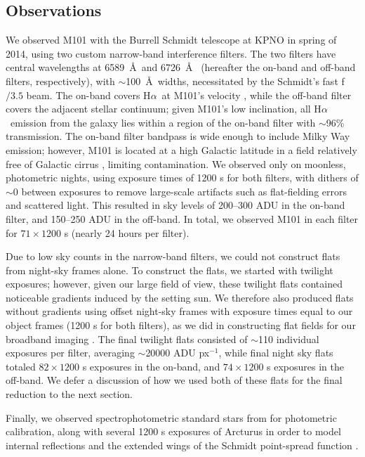 \documentclass[iop]{emulateapj}
\newcommand{\ha}{H$\alpha$}
\begin{document}
\subsection{Observations}

We observed M101 with the Burrell Schmidt telescope at KPNO in spring
of 2014, using two custom narrow-band interference filters. The two
filters have central wavelengths at 6589~\AA \ and 6726~\AA
\ (hereafter the on-band and off-band filters, respectively), with
$\sim$100~\AA \ widths, necessitated by the Schmidt's fast f$/3.5$
beam.  The on-band covers \ha \ at M101's velocity \citep[$\sim$240 km
  s$^{-1}$;][]{devau91}, while the off-band filter covers the adjacent
stellar continuum; given M101's low inclination, all \ha \ emission
from the galaxy lies within a region of the on-band filter with
$\sim$96\% transmission.  The on-band filter bandpass is wide enough
to include Milky Way emission; however, M101 is located at a high
Galactic latitude in a field relatively free of Galactic cirrus
\citep{schlegel98, schlafly11}, limiting contamination.  We observed
only on moonless, photometric nights, using exposure times of 1200 s
for both filters, with dithers of $\sim$0 between exposures
to remove large-scale artifacts such as flat-fielding errors and
scattered light.  This resulted in sky levels of 200--300 ADU in the
on-band filter, and 150--250 ADU in the off-band.  In total, we
observed M101 in each filter for $71 \times 1200$ s (nearly 24 hours
per filter).

Due to low sky counts in the narrow-band filters, we could not
construct flats from night-sky frames alone.  To construct the flats,
we started with twilight exposures; however, given our large field of
view, these twilight flats contained noticeable gradients induced by
the setting sun.  We therefore also produced flats without gradients
using offset night-sky frames with exposure times equal to our object
frames (1200 s for both filters), as we did in constructing flat
fields for our broadband imaging \citep[see][]{watkins14, mihos17}.
The final twilight flats consisted of $\sim$110 individual exposures
per filter, averaging $\sim$20000 ADU px$^{-1}$, while final night sky
flats totaled $82 \times 1200$ s exposures in the on-band, and $74
\times 1200$ s exposures in the off-band.  We defer a discussion of
how we used both of these flats for the final reduction to the next
section.

Finally, we observed spectrophotometric standard stars from
\citet{massey88} for photometric calibration, along with several 1200
s exposures of Arcturus in order to model internal reflections and the
extended wings of the Schmidt point-spread function \citep[PSF;
  see][]{slater09}.
\end{document}
